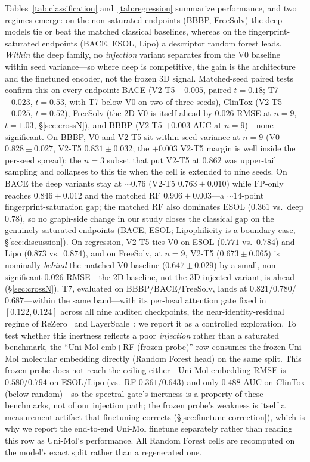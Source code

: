 \documentclass[sigconf,nonacm,anonymous,review]{acmart}
\begin{document}
Tables~\ref{tab:classification} and~\ref{tab:regression} summarize performance, and two regimes emerge: on the non-saturated endpoints (BBBP, FreeSolv) the deep models tie or beat the matched classical baselines, whereas on the fingerprint-saturated endpoints (BACE, ESOL, Lipo) a descriptor random forest leads. \emph{Within} the deep family, no \emph{injection} variant separates from the V0 baseline within seed variance---so where deep is competitive, the gain is the architecture and the finetuned encoder, not the frozen 3D signal. Matched-seed paired tests confirm this on every endpoint: BACE (V2-T5 $+0.005$, paired $t{=}0.18$; T7 $+0.023$, $t{=}0.53$, with T7 below V0 on two of three seeds), ClinTox (V2-T5 $+0.025$, $t{=}0.52$), FreeSolv (the 2D V0 is itself ahead by $0.026$ RMSE at $n{=}9$, $t{=}1.03$, \S\ref{sec:crossN}), and BBBP (V2-T5 $+0.003$ AUC at $n{=}9$)---none significant. On BBBP, V0 and V2-T5 sit within seed variance at $n{=}9$ (V0 $0.828 \pm 0.027$, V2-T5 $0.831 \pm 0.032$; the $+0.003$ V2-T5 margin is well inside the per-seed spread); the $n{=}3$ subset that put V2-T5 at $0.862$ was upper-tail sampling and collapses to this tie when the cell is extended to nine seeds. On BACE the deep variants stay at $\sim$$0.76$ (V2-T5 $0.763 \pm 0.010$) while FP-only reaches $0.846 \pm 0.012$ and the matched RF $0.906 \pm 0.003$---a $\sim$$14$-point fingerprint-saturation gap; the matched RF also dominates ESOL ($0.361$ vs.\ deep $0.78$), so no graph-side change in our study closes the classical gap on the genuinely saturated endpoints (BACE, ESOL; Lipophilicity is a boundary case, \S\ref{sec:discussion}). On regression, V2-T5 ties V0 on ESOL ($0.771$ vs.\ $0.784$) and Lipo ($0.873$ vs.\ $0.874$), and on FreeSolv, at $n{=}9$, V2-T5 ($0.673 \pm 0.065$) is nominally \emph{behind} the matched V0 baseline ($0.647 \pm 0.029$) by a small, non-significant $0.026$ RMSE---the 2D baseline, not the 3D-injected variant, is ahead (\S\ref{sec:crossN}). T7, evaluated on BBBP/BACE/FreeSolv, lands at $0.821$/$0.780$/$0.687$---within the same band---with its per-head attention gate fixed in $[0.122,0.124]$ across all nine audited checkpoints, the near-identity-residual regime of ReZero~\citep{bachlechner2021rezero} and LayerScale~\citep{touvron2021cait}; we report it as a controlled exploration. To test whether this inertness reflects a poor \emph{injection} rather than a saturated benchmark, the ``Uni-Mol-emb$+$RF (frozen probe)'' row consumes the frozen Uni-Mol molecular embedding directly (Random Forest head) on the same split. This frozen probe does not reach the ceiling either---Uni-Mol-embedding RMSE is $0.580$/$0.794$ on ESOL/Lipo (vs.\ RF $0.361$/$0.643$) and only $0.488$ AUC on ClinTox (below random)---so the spectral gate's inertness is a property of these benchmarks, not of our injection path; the frozen probe's weakness is itself a measurement artifact that finetuning corrects (\S\ref{sec:finetune-correction}), which is why we report the end-to-end Uni-Mol finetune separately rather than reading this row as Uni-Mol's performance. All Random Forest cells are recomputed on the model's exact split rather than a regenerated one.
\end{document}
